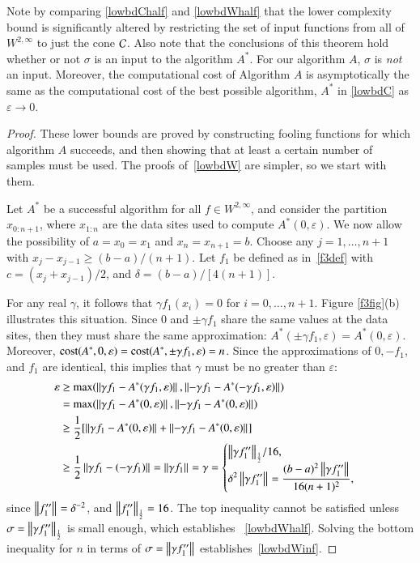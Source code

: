 \documentclass[review]{elsarticle}
\newcommand{\abstol}{\varepsilon}
\theoremstyle{definition}
\renewcommand{\cw}{W}
\begin{document}
Note by comparing \eqref{lowbdChalf} and \eqref{lowbdWhalf} that the lower complexity
bound is significantly altered by restricting the
set of input functions from all of $ \cw^{2,\infty}$ to just the cone
$\cc$. Also note that the
conclusions of this theorem hold whether or not $\sigma$ is an input to the
algorithm $A^*$. For our algorithm $A$, $\sigma$ is \emph{not} an input. Moreover, the
computational cost of Algorithm $A$ is asymptotically
the same as the computational cost of the best possible algorithm, $A^*$ in
\eqref{lowbdC} as $\abstol \to 0$.

\begin{proof}
	These lower bounds are proved by constructing fooling functions for which
	algorithm $A$ succeeds, and then showing that at least a certain number of
	samples must be used. The proofs of~\eqref{lowbdW} are simpler, so
	we start with them.
		
	Let $A^*$ be a successful algorithm for all $f \in \cw^{2,\infty}$, and consider
	the partition $x_{0:n+1}$, where $x_{1:n}$ are the data sites
	used to compute $A^*(0,\abstol)$.  We now allow the possibility of $a = x_0=x_1$
	and $x_n = x_{n+1} = b$. Choose any $j=1, \ldots, n+1$ with
	$x_j-x_{j-1} \ge (b-a)/(n+1)$. Let $f_1$ be defined as in~\eqref{f3def} with $c
	= (x_j+x_{j-1})/2$, and $\delta = (b-a)/[4(n+1)]$. 
	
	For any real $\gamma$, it follows that $\gamma f_1(x_i)=0$ for $i=0, \ldots,
	n+1$. Figure \ref{f3fig}(b) illustrates this situation. Since $0$ and $\pm
	\gamma f_1$ share the same values at the data sites, then they must share the
	same approximation: $A^*(\pm \gamma f_1,\abstol) = A^*(0,\abstol)$. Moreover,
	$\cost(A^*,0,\abstol) = \cost(A^*,\pm \gamma f_1,\abstol) = n$. Since the
	approximations of $0, -f_1$, and $f_1$ are identical, this implies that $\gamma$
	must be no greater than $\abstol$:
	\begin{align*}
	\abstol  &\ge \max(\norm{\gamma f_1 - A^*(\gamma f_1,\abstol)},
	\norm{-\gamma f_1 - A^*(-\gamma f_1,\abstol)}) \\
	&= \max(\norm{\gamma f_1 - A^*(0,\abstol)}, \norm{-\gamma f_1 - A^*(0,\abstol)}) \\
	& \ge \frac{1}{2} [\norm{\gamma f_1 - A^*(0,\abstol)}
	+ \norm{-\gamma f_1 - A^*(0,\abstol)}] \\
	& \ge \frac{1}{2} \norm{\gamma f_1 - (-\gamma f_1)} =  \norm{\gamma f_1}
	= \gamma %
	= \begin{cases} \displaystyle { \norm[\frac 12]{\gamma f_1''}}/{16} , \\
	\displaystyle \delta^2 	\norm{\gamma f_1''}
	=  \frac{(b-a)^2 \norm{\gamma f_1''}}{16(n+1)^2},
	\end{cases}
	\end{align*}
	since $\norm{f_1''} =  \delta^{-2}$,  and $\norm[\frac 12]{f_1''} = 16$. The top inequality 
	cannot be satisfied unless $\sigma = \norm[\frac 12]{\gamma
	f_1''}$ is small enough, which establishes ~\eqref{lowbdWhalf}. Solving the
	bottom inequality for $n$ in terms of $\sigma = \norm{\gamma f_1''}$
	establishes~\eqref{lowbdWinf}.



\end{proof}
\end{document}
